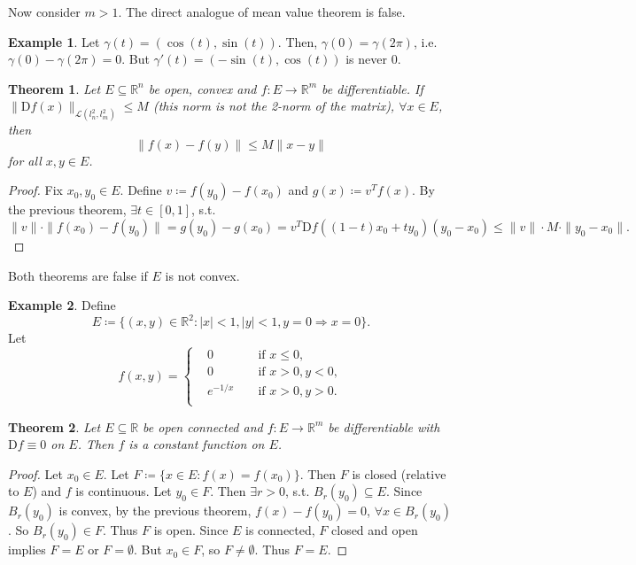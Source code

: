 \documentclass[12pt]{article}
\theoremstyle{plain}
\newtheorem{thm}{Theorem}
\theoremstyle{definition}
\newtheorem*{eg}{Example}
\begin{document}
Now consider $m>1$.
The direct analogue of mean value theorem is false.
\begin{eg}
    Let $\gamma(t) = (\cos(t), \sin(t))$.
    Then, $\gamma(0) = \gamma(2\pi)$, i.e. $\gamma(0)-\gamma(2\pi) = 0$.
    But $\gamma'(t) = (-\sin(t), \cos(t))$ is never $0$.
\end{eg}

\begin{thm}
    Let $E\subseteq \mathbb{R}^n$ be open, convex and $f:E\rightarrow \mathbb{R}^m$ be differentiable.
    If $\|\mathrm{D}f(x)\|_{\mathcal{L}(l^2_n, l^2_m)} \leq M$ (this norm is not the 2-norm of the matrix), $\forall x\in E$,
    then
    \[
        \|f(x) - f(y)\| \leq M\|x-y\|
    \]
    for all $x,y\in E$.
\end{thm}
\begin{proof}
    Fix $x_0, y_0\in E$.
    Define $v\coloneqq f(y_0) - f(x_0)$ and $g(x)\coloneqq v^T f(x)$.
    By the previous theorem, $\exists t\in[0,1]$, s.t.\
    \[
        \|v\|\cdot\|f(x_0) - f(y_0)\| = g(y_0) - g(x_0) = v^T\mathrm{D}f((1-t)x_0+ty_0)(y_0-x_0) \leq \|v\|\cdot M\cdot\|y_0-x_0\|.
    \]
\end{proof}

Both theorems are false if $E$ is not convex.
\begin{eg}
    Define
    \[
        E\coloneqq \{(x,y)\in\mathbb{R}^2: |x|<1, |y|<1, y=0\Rightarrow x=0\}.
    \]
    Let
    \[
        f(x,y)=\left\{
            \begin{aligned}
                &0\qquad&&\text{if }x\leq 0,\\
                &0\qquad&&\text{if }x>0, y<0,\\
                &e^{-1/x}&&\text{if }x>0, y>0.\\
            \end{aligned}
        \right.
    \]
\end{eg}

\begin{thm}
    Let $E\subseteq \mathbb{R}$ be open connected and $f: E\rightarrow \mathbb{R}^m$ be differentiable with $\mathrm{D}f \equiv 0$ on $E$.
    Then $f$ is a constant function on $E$.
\end{thm}
\begin{proof}
    Let $x_0\in E$.
    Let $F\coloneqq \{x\in E: f(x) = f(x_0)\}$.
    Then $F$ is closed (relative to $E$) and $f$ is continuous.
    Let $y_0\in F$.
    Then $\exists r>0$, s.t. $B_r(y_0)\subseteq E$.
    Since $B_r(y_0)$ is convex, by the previous theorem, $f(x) - f(y_0) = 0$, $\forall x\in B_r(y_0)$.
    So $B_r(y_0)\in F$.
    Thus $F$ is open.
    Since $E$ is connected, $F$ closed and open implies $F=E$ or $F=\emptyset$.
    But $x_0\in F$, so $F\neq \emptyset$.
    Thus $F = E$.
\end{proof}
\end{document}
